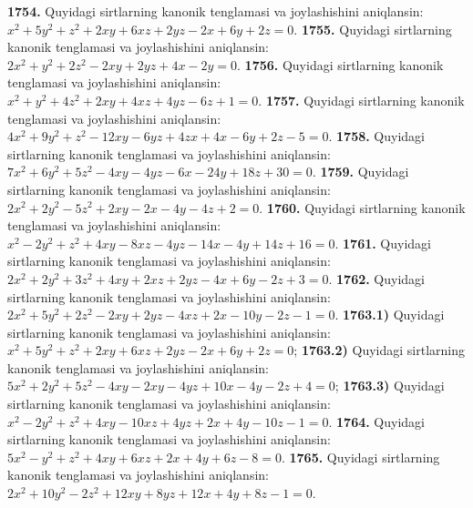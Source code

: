 \textbf{1754.} Quyidagi sirtlarning kanonik tenglamasi va joylashishini aniqlansin: $x^2+5 y^2+z^2+2 x y+6 x z+2 y z-2 x+6 y+2 z=0$.
\textbf{1755.} Quyidagi sirtlarning kanonik tenglamasi va joylashishini aniqlansin: $2 x^2+y^2+2 z^2-2 x y+2 y z+4 x-2 y=0$.
\textbf{1756.} Quyidagi sirtlarning kanonik tenglamasi va joylashishini aniqlansin: $x^2+y^2+4 z^2+2 x y+4 x z+4 y z-6 z+1=0$.
\textbf{1757.} Quyidagi sirtlarning kanonik tenglamasi va joylashishini aniqlansin: $4 x^2+9 y^2+z^2-12 x y-6 y z+4 z x+4 x-6 y+2 z-5=0$.
\textbf{1758.} Quyidagi sirtlarning kanonik tenglamasi va joylashishini aniqlansin: $7 x^2+6 y^2+5 z^2-4 x y-4 y z-6 x-24 y+18 z+30=0$.
\textbf{1759.} Quyidagi sirtlarning kanonik tenglamasi va joylashishini aniqlansin: $2 x^2+2 y^2-5 z^2+2 x y-2 x-4 y-4 z+2=0$.
\textbf{1760.} Quyidagi sirtlarning kanonik tenglamasi va joylashishini aniqlansin: $x^2-2 y^2+z^2+4 x y-8 x z-4 y z-14 x-4 y+14 z+16=0$.
\textbf{1761.} Quyidagi sirtlarning kanonik tenglamasi va joylashishini aniqlansin: $2 x^2+2 y^2+3 z^2+4 x y+2 x z+2 y z-4 x+6 y-2 z+3=0$.
\textbf{1762.} Quyidagi sirtlarning kanonik tenglamasi va joylashishini aniqlansin: $2 x^2+5 y^2+2 z^2-2 x y+2 y z-4 x z+2 x-10 y-2 z-1=0$.
\textbf{1763.1)} Quyidagi sirtlarning kanonik tenglamasi va joylashishini aniqlansin: $x^2+5 y^2+z^2+2 x y+6 x z+2 y z-2 x+6 y+2 z=0$;
\textbf{1763.2)} Quyidagi sirtlarning kanonik tenglamasi va joylashishini aniqlansin: $5 x^2+2 y^2+5 z^2-4 x y-2 x y-4 y z+10 x-4 y-2 z+4=0$;
\textbf{1763.3)} Quyidagi sirtlarning kanonik tenglamasi va joylashishini aniqlansin: $x^2-2 y^2+z^2+4 x y-10 x z+4 y z+2 x+4 y-10 z-1=0$.
\textbf{1764.} Quyidagi sirtlarning kanonik tenglamasi va joylashishini aniqlansin: $5 x^2-y^2+z^2+4 x y+6 x z+2 x+4 y+6 z-8=0$.
\textbf{1765.} Quyidagi sirtlarning kanonik tenglamasi va joylashishini aniqlansin: $2 x^2+10 y^2-2 z^2+12 x y+8 y z+12 x+4 y+8 z-1=0$.

